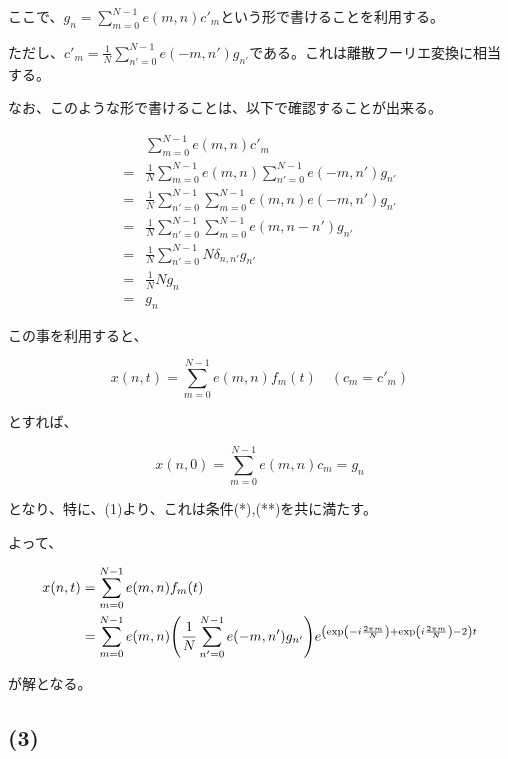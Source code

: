 \documentclass[a4paper, 10pt, dvipdfmx]{jlreq}
\begin{document}
ここで、$g_n=\sum_{m=0}^{N-1}e(m,n)c'_m$という形で書けることを利用する。

ただし、$c'_m=\frac{1}{N}\sum_{n'=0}^{N-1}e(-m,n')g_{n'}$である。これは離散フーリエ変換に相当する。

なお、このような形で書けることは、以下で確認することが出来る。

\begin{align*}
      & \sum_{m=0}^{N-1}e(m,n)c'_m                                       \\
  ={} & \frac{1}{N}\sum_{m=0}^{N-1}e(m,n)\sum_{n'=0}^{N-1}e(-m,n')g_{n'} \\
  ={} & \frac{1}{N}\sum_{n'=0}^{N-1}\sum_{m=0}^{N-1}e(m,n)e(-m,n')g_{n'} \\
  ={} & \frac{1}{N}\sum_{n'=0}^{N-1}\sum_{m=0}^{N-1}e(m,n-n')g_{n'}      \\
  ={} & \frac{1}{N}\sum_{n'=0}^{N-1}N\delta_{n,n'}g_{n'}                 \\
  ={} & \frac{1}{N}Ng_n                                                  \\
  ={} & g_n
\end{align*}

この事を利用すると、

\begin{equation*}
  x(n,t)=\sum_{m=0}^{N-1}e(m,n)f_m(t) \quad (c_m=c'_m)
\end{equation*}

とすれば、

\begin{equation*}
  x(n,0)=\sum_{m=0}^{N-1}e(m,n)c_m=g_n
\end{equation*}

となり、特に、(1)より、これは条件(*),(**)を共に満たす。

よって、

\begin{align*}
  x(n,t) & =\sum_{m=0}^{N-1}e(m,n)f_m(t)                                                                                                        \\
         & =\sum_{m=0}^{N-1}e(m,n)\qty(\frac{1}{N}\sum_{n'=0}^{N-1}e(-m,n')g_{n'})e^{\qty(\exp(-i\frac{2\pi m}{N})+\exp(i\frac{2\pi m}{N})-2)t}
\end{align*}

が解となる。

\subsection*{(3)}
\end{document}
